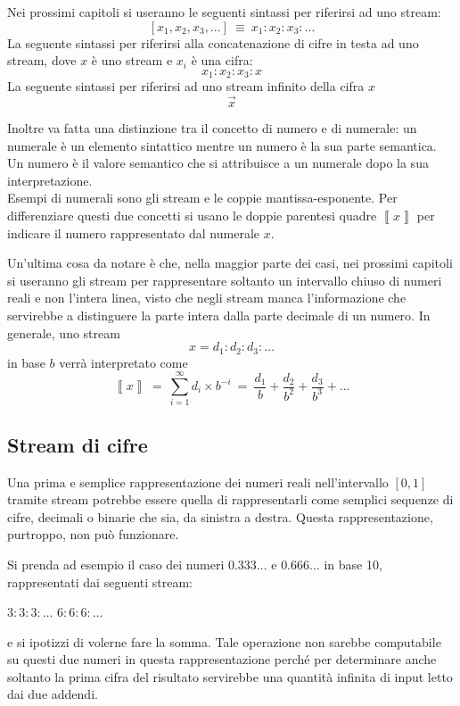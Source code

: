 \documentclass[Lau,oneside]{sapthesis}
\begin{document}
\medskip

Nei prossimi capitoli si useranno le seguenti sintassi per riferirsi ad uno 
stream:
$$\left[x_1, x_2, x_3,\ldots\right]\ \equiv\ x_1:x_2:x_3:\ldots$$
La seguente sintassi per riferirsi alla concatenazione di cifre in testa ad uno 
stream, dove $x$ è uno stream e $x_i$ è una cifra:
$$x_1:x_2:x_3:x$$
La seguente sintassi per riferirsi ad uno stream infinito della cifra $x$
$$\overrightarrow{x}$$

Inoltre va fatta una distinzione tra il concetto di numero e di numerale: un numerale è un elemento sintattico mentre un numero è la sua parte semantica. Un numero è il valore semantico che si attribuisce a un numerale dopo la sua interpretazione.\\
Esempi di numerali sono gli stream e le coppie mantissa-esponente. Per differenziare questi due concetti si usano le doppie parentesi quadre 
$\left\llbracket x\right\rrbracket$ per indicare il numero rappresentato dal 
numerale 
$x$.

Un'ultima cosa da notare è che, nella maggior parte dei casi, nei prossimi 
capitoli si useranno gli stream per rappresentare soltanto un intervallo chiuso 
di numeri reali e non l'intera linea, visto che negli stream manca 
l'informazione che servirebbe a distinguere la parte intera dalla parte decimale 
di un numero. In generale, uno stream
$$x=d_1:d_2:d_3:\ldots$$
in base $b$ verrà interpretato come
$$\left\llbracket x\right\rrbracket\ =\ \sum_{i=1}^{\infty} d_i \times b^{-i}\ =\ 
\frac{d_1}{b}+\frac{d_2}{b^2}+\frac{d_3}{b^3}+\ldots$$


\subsection{Stream di cifre}
Una prima e semplice rappresentazione dei numeri reali nell'intervallo $\left[0,1 \right]$ tramite stream potrebbe 
essere quella di rappresentarli come semplici sequenze di cifre, decimali o 
binarie che sia, da sinistra a destra. Questa rappresentazione, purtroppo, non 
può funzionare.

Si prenda ad esempio il caso dei numeri $0.333\ldots$ e $0.666\ldots$ in 
base 10, rappresentati dai seguenti stream:
\begin{center}
$3:3:3:\ldots$ \hspace{1cm} $6:6:6:\ldots$
\end{center}
e si ipotizzi di volerne fare la somma. Tale operazione non sarebbe computabile su questi due numeri in questa 
rappresentazione perché per determinare anche soltanto la prima cifra del 
risultato servirebbe una quantità infinita di input letto dai due addendi.
\end{document}
